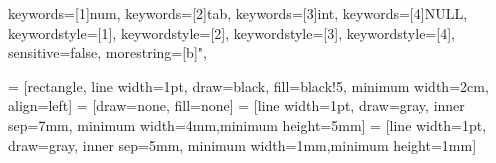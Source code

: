 
{
keywords=[1]{num},
keywords=[2]{tab},
keywords=[3]{int},
keywords=[4]{NULL},
keywordstyle=[1]\color{mBlue},
keywordstyle=[2]\color{red},
keywordstyle=[3]\color{mViolet},
keywordstyle=[4]\color{red},
sensitive=false,
morestring=[b]",
}

\lstset{numbers=none, style=DumpStyle}


 = [rectangle, line width=1pt, draw=black, fill=black!5, minimum width=2cm, align=left]
 = [draw=none, fill=none]
 = [line width=1pt, draw=gray, inner sep=7mm, minimum width=4mm,minimum height=5mm]
 = [line width=1pt, draw=gray, inner sep=5mm, minimum width=1mm,minimum height=1mm]




\setlength{\columnsep}{1cm}

\newcommand{\keyword}[1]{\textcolor{red}{\emph{#1}}}
\newcommand{\myblocknode}[2]{\node[squarednode,label={[shift={(0.0,0)}]\scriptsize[#1] \hspace{0.5cm} #2}] }
\newcommand{\myloopframe}[2]{\node[label={[shift={(0,0)}]LOOP \hspace{1.3cm} \scriptsize0001}, frame_loop,fit= (#1) (#2)]{}}
\newcommand{\mylooplabel}[1]{LOOP \hspace{1.3cm} \scriptsize#1}
\newcommand{\mymargin}[1]{}



\renewcommand{\theenumi}{(\roman{enumi})}